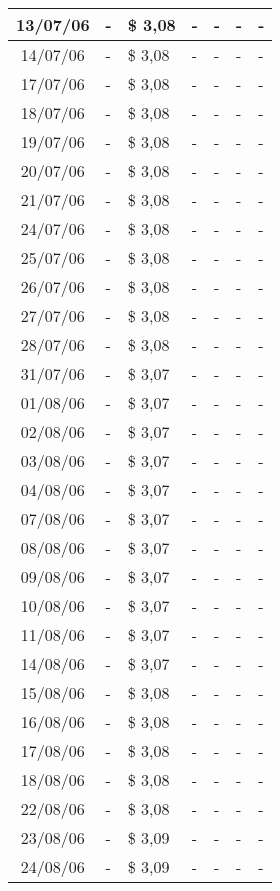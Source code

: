 \begin{center}
\begin{longtable}{|c|p{1.5cm}|p{1.5cm}|p{1.5cm}|p{1.5cm}|p{1.5cm}|p{1.5cm}|}
13/07/06 & - & \$ 3,08 & - & - & - & - \\ \hline
14/07/06 & - & \$ 3,08 & - & - & - & - \\ \hline
17/07/06 & - & \$ 3,08 & - & - & - & - \\ \hline
18/07/06 & - & \$ 3,08 & - & - & - & - \\ \hline
19/07/06 & - & \$ 3,08 & - & - & - & - \\ \hline
20/07/06 & - & \$ 3,08 & - & - & - & - \\ \hline
21/07/06 & - & \$ 3,08 & - & - & - & - \\ \hline
24/07/06 & - & \$ 3,08 & - & - & - & - \\ \hline
25/07/06 & - & \$ 3,08 & - & - & - & - \\ \hline
26/07/06 & - & \$ 3,08 & - & - & - & - \\ \hline
27/07/06 & - & \$ 3,08 & - & - & - & - \\ \hline
28/07/06 & - & \$ 3,08 & - & - & - & - \\ \hline
31/07/06 & - & \$ 3,07 & - & - & - & - \\ \hline
01/08/06 & - & \$ 3,07 & - & - & - & - \\ \hline
02/08/06 & - & \$ 3,07 & - & - & - & - \\ \hline
03/08/06 & - & \$ 3,07 & - & - & - & - \\ \hline
04/08/06 & - & \$ 3,07 & - & - & - & - \\ \hline
07/08/06 & - & \$ 3,07 & - & - & - & - \\ \hline
08/08/06 & - & \$ 3,07 & - & - & - & - \\ \hline
09/08/06 & - & \$ 3,07 & - & - & - & - \\ \hline
10/08/06 & - & \$ 3,07 & - & - & - & - \\ \hline
11/08/06 & - & \$ 3,07 & - & - & - & - \\ \hline
14/08/06 & - & \$ 3,07 & - & - & - & - \\ \hline
15/08/06 & - & \$ 3,08 & - & - & - & - \\ \hline
16/08/06 & - & \$ 3,08 & - & - & - & - \\ \hline
17/08/06 & - & \$ 3,08 & - & - & - & - \\ \hline
18/08/06 & - & \$ 3,08 & - & - & - & - \\ \hline
22/08/06 & - & \$ 3,08 & - & - & - & - \\ \hline
23/08/06 & - & \$ 3,09 & - & - & - & - \\ \hline
24/08/06 & - & \$ 3,09 & - & - & - & - \\ \hline

\end{longtable}
\end{center}
